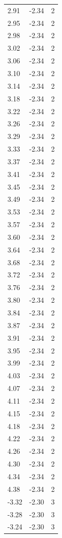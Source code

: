 \begin{longtable}{lrr}
  2.91 & -2.34 & 2 \\
  2.95 & -2.34 & 2 \\
  2.98 & -2.34 & 2 \\
  3.02 & -2.34 & 2 \\
  3.06 & -2.34 & 2 \\
  3.10 & -2.34 & 2 \\
  3.14 & -2.34 & 2 \\
  3.18 & -2.34 & 2 \\
  3.22 & -2.34 & 2 \\
  3.26 & -2.34 & 2 \\
  3.29 & -2.34 & 2 \\
  3.33 & -2.34 & 2 \\
  3.37 & -2.34 & 2 \\
  3.41 & -2.34 & 2 \\
  3.45 & -2.34 & 2 \\
  3.49 & -2.34 & 2 \\
  3.53 & -2.34 & 2 \\
  3.57 & -2.34 & 2 \\
  3.60 & -2.34 & 2 \\
  3.64 & -2.34 & 2 \\
  3.68 & -2.34 & 2 \\
  3.72 & -2.34 & 2 \\
  3.76 & -2.34 & 2 \\
  3.80 & -2.34 & 2 \\
  3.84 & -2.34 & 2 \\
  3.87 & -2.34 & 2 \\
  3.91 & -2.34 & 2 \\
  3.95 & -2.34 & 2 \\
  3.99 & -2.34 & 2 \\
  4.03 & -2.34 & 2 \\
  4.07 & -2.34 & 2 \\
  4.11 & -2.34 & 2 \\
  4.15 & -2.34 & 2 \\
  4.18 & -2.34 & 2 \\
  4.22 & -2.34 & 2 \\
  4.26 & -2.34 & 2 \\
  4.30 & -2.34 & 2 \\
  4.34 & -2.34 & 2 \\
  4.38 & -2.34 & 2 \\
  -3.32 & -2.30 & 3 \\
  -3.28 & -2.30 & 3 \\
  -3.24 & -2.30 & 3 \\

\end{longtable}
